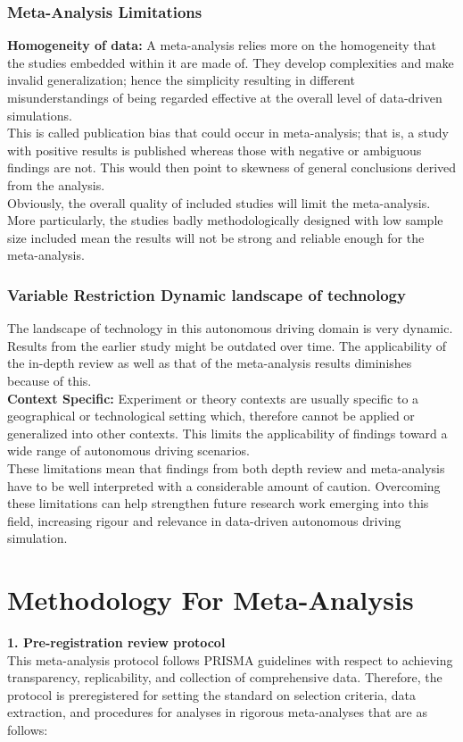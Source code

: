 \documentclass[lettersize,journal]{IEEEtran}
\begin{document}
\subsubsection{Meta-Analysis Limitations}
\textbf{Homogeneity of data:} A meta-analysis relies more on the homogeneity that the studies embedded within it are made of. They develop complexities and make invalid generalization; hence the simplicity resulting in different misunderstandings of being regarded effective at the overall level of data-driven simulations.\\
This is called publication bias that could occur in meta-analysis; that is, a study with positive results is published whereas those with negative or ambiguous findings are not. This would then point to skewness of general conclusions derived from the analysis.\\
Obviously, the overall quality of included studies will limit the meta-analysis. More particularly, the studies badly methodologically designed with low sample size included mean the results will not be strong and reliable enough for the meta-analysis.

\subsubsection{Variable Restriction Dynamic landscape of technology}
The landscape of technology in this autonomous driving domain is very dynamic. Results from the earlier study might be outdated over time. The applicability of the in-depth review as well as that of the meta-analysis results diminishes because of this.\\
\textbf{Context Specific:} Experiment or theory contexts are usually specific to a geographical or technological setting which, therefore cannot be applied or generalized into other contexts. This limits the applicability of findings toward a wide range of autonomous driving scenarios.\\

These limitations mean that findings from both depth review and meta-analysis have to be well interpreted with a considerable amount of caution. Overcoming these limitations can help strengthen future research work emerging into this field, increasing rigour and relevance in data-driven autonomous driving simulation.





\section{Methodology For Meta-Analysis}
\textbf{1. Pre-registration review protocol} \\
This meta-analysis protocol follows PRISMA guidelines with respect to achieving transparency, replicability, and collection of comprehensive data. Therefore, the protocol is preregistered for setting the standard on selection criteria, data extraction, and procedures for analyses in rigorous meta-analyses that are as follows:
\end{document}
